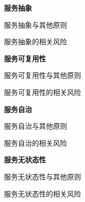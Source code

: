 \textbf{服务抽象} \par
服务抽象与其他原则
\begin{spacing}{1.2}
    \vspace{-0.5em}
    
    \vspace{-1em}
\end{spacing}

服务抽象的相关风险
\begin{spacing}{1.2}
    \vspace{-0.5em}
    
    \vspace{-1em}
\end{spacing}

\textbf{服务可复用性} \par
服务可复用性与其他原则
\begin{spacing}{1.2}
    \vspace{-0.5em}
    
    \vspace{-1em}
\end{spacing}

服务可复用性的相关风险
\begin{spacing}{1.2}
    \vspace{-0.5em}
    
    \vspace{-1em}
\end{spacing}

\textbf{服务自治} \par
服务自治与其他原则
\begin{spacing}{1.2}
    \vspace{-0.5em}
    
    \vspace{-1em}
\end{spacing}

服务自治的相关风险
\begin{spacing}{1.2}
    \vspace{-0.5em}
    
    \vspace{-1em}
\end{spacing}

\textbf{服务无状态性} \par
服务无状态性与其他原则
\begin{spacing}{1.2}
    \vspace{-0.5em}
    
    \vspace{-1em}
\end{spacing}

服务无状态性的相关风险
\begin{spacing}{1.2}
    \vspace{-0.5em}
    
    \vspace{-1em}
\end{spacing}

